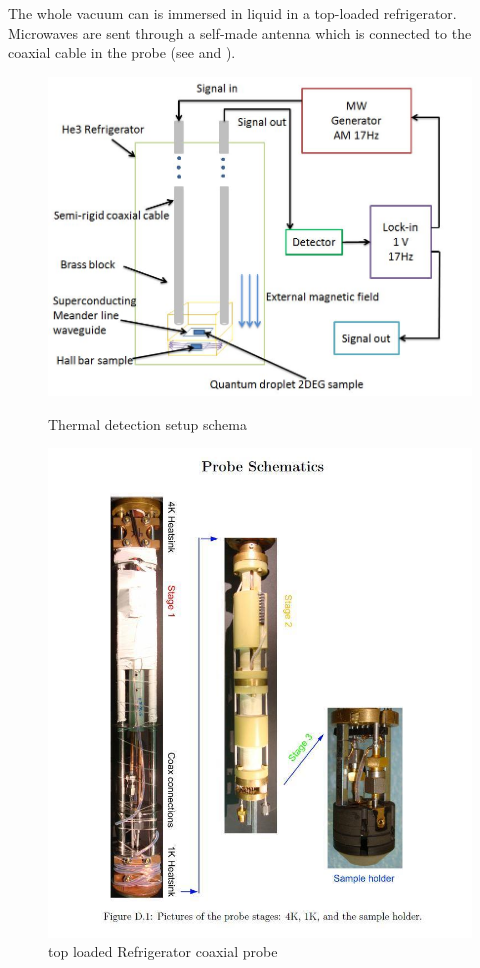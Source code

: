 \documentclass[12pt]{ruthesis}
\begin{document}
The whole vacuum can is immersed in liquid  in a top-loaded refrigerator.
Microwaves are sent through a self-made antenna which is connected to the coaxial cable in the probe (see  and ).\cite{KrisThesis} 
 

\begin{figure}[!htb]\centering
   \begin{minipage}{0.49\textwidth}
     \includegraphics[width=\linewidth]{figures/SCHEMA.JPG}
     \caption{Thermal detection setup schema}\label{thermal-schema}
   \end{minipage}
   \begin {minipage}{0.49\textwidth}
     \includegraphics[width=\linewidth]{figures/probe.JPG}
     \caption{ top loaded Refrigerator coaxial probe}\label{probe}
   \end{minipage}
\end{figure}
\end{document}

